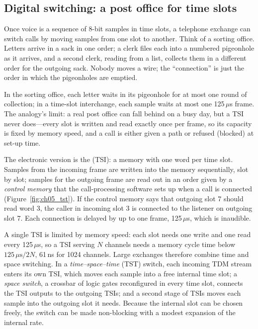\subsection{Digital switching: a post office for time slots}

Once voice is a sequence of 8-bit samples in time slots, a telephone exchange can switch calls by
moving samples from one slot to another. Think of a sorting office. Letters arrive in a sack in
one order; a clerk files each into a numbered pigeonhole as it arrives, and a second clerk, reading
from a list, collects them in a different order for the outgoing sack. Nobody moves a wire; the
``connection'' is just the order in which the pigeonholes are emptied.

\begin{analogy}
In the sorting office, each letter waits in its pigeonhole for at most one round of collection;
in a time-slot interchange, each sample waits at most one 125\,$\mu$s frame. The analogy's limit:
a real post office can fall behind on a busy day, but a TSI never does---every slot is written and
read exactly once per frame, so its capacity is fixed by memory speed, and a call is either given
a path or refused (blocked) at set-up time.
\end{analogy}

The electronic version is the  (TSI): a memory with one word per time
slot. Samples from the incoming frame are written into the memory sequentially, slot by slot;
samples for the outgoing frame are read out in an order given by a \emph{control memory} that the
call-processing software sets up when a call is connected (Figure~\ref{fig:ch05_tst}). If the
control memory says that outgoing slot 7 should read word 3, the caller in incoming slot 3 is
connected to the listener on outgoing slot 7. Each connection is delayed by up to one frame,
125\,$\mu$s, which is inaudible.

A single TSI is limited by memory speed: each slot needs one write and one read every 125\,$\mu$s,
so a TSI serving $N$ channels needs a memory cycle time below $125\,\mu\text{s}/2N$, 61\,ns for
1024 channels. Large exchanges therefore combine time and space switching. In a
\emph{time--space--time} (TST) switch, each incoming TDM stream enters its own TSI, which moves
each sample into a free internal time slot; a \emph{space switch}, a crossbar of logic gates
reconfigured in every time slot, connects the TSI outputs to the outgoing TSIs; and a second
stage of TSIs moves each sample into the outgoing slot it needs. Because the internal slot can be
chosen freely, the switch can be made non-blocking with a modest expansion of the internal rate.

